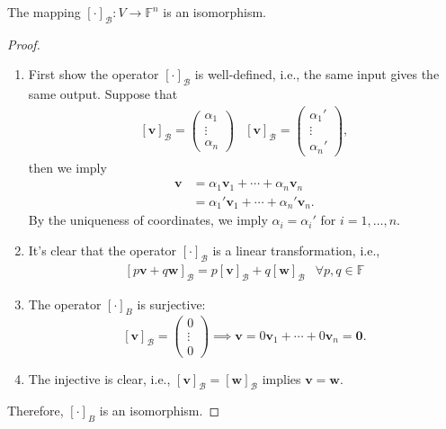 \begin{theorem}\label{The:3:1}
The mapping $[\cdot]_{\mathcal{B}}:V\to\mathbb{F}^n$ is an isomorphism.
\end{theorem}

\begin{proof}
\begin{enumerate}
\item
First show the operator $[\cdot]_{\mathcal{B}}$ is well-defined, i.e., the same input gives the same output. Suppose that
\[
\begin{array}{ll}
[\bm v]_{\mathcal{B}}=
\begin{pmatrix}
\alpha_1\\\vdots\\\alpha_n
\end{pmatrix}
&
[\bm v]_{\mathcal{B}}=\begin{pmatrix}
\alpha_1'\\\vdots\\\alpha_n'
\end{pmatrix},
\end{array}
\]
then we imply
\begin{align*}
\bm v&=\alpha_1\bm v_1+\cdots+\alpha_n\bm v_n\\
&=\alpha_1'\bm v_1+\cdots+\alpha_n'\bm v_n.
\end{align*}
By the uniqueness of coordinates, we imply $\alpha_i=\alpha_i'$ for $i=1,\dots,n$.
\item
It's clear that the operator $[\cdot]_{\mathcal{B}}$ is a linear transformation, i.e., 
\[
\begin{array}{ll}
[p\bm v+q\bm w]_{\mathcal{B}}=p[\bm v]_{\mathcal{B}}+q[\bm w]_{\mathcal{B}}
&
\forall p,q\in\mathbb{F}
\end{array}
\]
\item
The operator $[\cdot]_B$ is surjective:
\[
[\bm v]_{\mathcal{B}}=\begin{pmatrix}
0\\\vdots\\0
\end{pmatrix}\implies
\bm v=0\bm v_1+\cdots+0\bm v_n=\bm0.
\]
\item
The injective is clear, i.e., $[\bm v]_{\mathcal{B}}=[\bm w]_{\mathcal{B}}$ implies $\bm v=\bm w$.
\end{enumerate}
Therefore, $[\cdot]_B$ is an isomorphism.
\end{proof}


